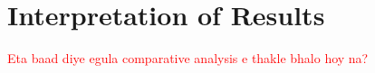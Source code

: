 
\section{Interpretation of Results}
\label{sec:interpretation_of_results}

\textcolor{red}{\fontsize{18}{14}\selectfont Eta baad diye egula comparative analysis e thakle bhalo hoy na?}